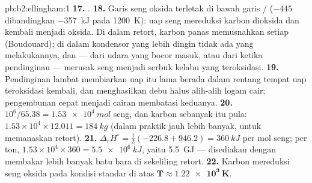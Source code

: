 \begin{solution}{pb:b2:ellingham:1}
\textbf{17.} .
\textbf{18.} Garis seng oksida terletak di bawah garis /
($-445$ dibandingkan \qty{-357}{kJ} pada \qty{1200}{K}): uap seng
mereduksi karbon dioksida dan kembali menjadi oksida. Di dalam retort,
karbon panas memusnahkan setiap  (Boudouard); di dalam kondensor
yang lebih dingin tidak ada yang melakukannya, dan  --- dari udara
yang bocor masuk, atau dari  ketika pendinginan ---
merusak seng menjadi serbuk kelabu yang teroksidasi.
\textbf{19.} Pendinginan lambat membiarkan uap itu lama berada dalam
rentang tempat uap teroksidasi kembali, dan menghasilkan debu halus alih-alih
logam cair; pengembunan cepat menjadi cairan membatasi keduanya.
\textbf{20.} $10^6/65.38 = \qty{1.53e4}{mol}$ seng, dan karbon sebanyak
itu pula: $1.53 \times 10^4 \times 12.011 = \qty{184}{kg}$ (dalam praktik
jauh lebih banyak, untuk memanaskan retort).
\textbf{21.} $\Delta_r H^\circ = \frac12(-226.8 + 946.2) = \qty{+360}{kJ}$
per mol seng; per ton, $1.53 \times 10^4 \times 360 = \qty{5.5e6}{kJ}$,
yaitu \qty{5.5}{GJ} --- disediakan dengan membakar lebih banyak batu bara
di sekeliling retort.
\textbf{22.} Karbon mereduksi seng oksida pada kondisi standar di atas
$\boldsymbol{T \approx \qty{1.22e3}{K}}$.
\end{solution}
